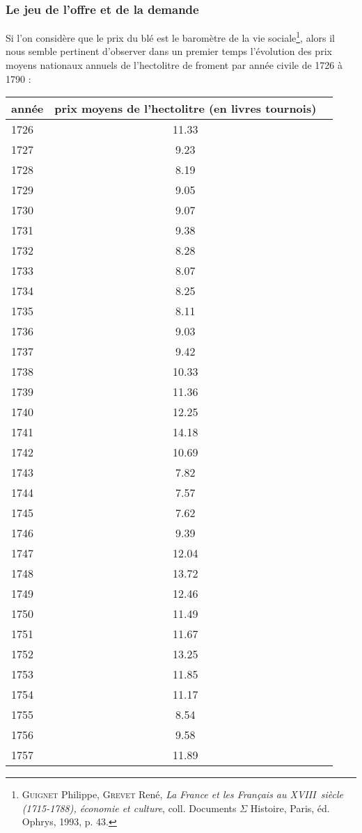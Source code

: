\documentclass[a4paper,11pt,]{scrartcl}
\begin{document}
\subsubsection{Le jeu de l'offre et de la demande}

Si l'on considère que le prix du blé est le \og baromètre de la vie
sociale\fg\footnote{\textsc{Guignet} Philippe, \textsc{Grevet} René,
  \emph{La France et les Français au XVIII\ieme~siècle (1715-1788), économie
et culture}, coll. \og Documents $\Sigma$ Histoire\fg, Paris, éd. Ophrys, 1993, p. 43.}, alors il nous semble pertinent d'observer dans un premier temps l'évolution des prix moyens nationaux annuels de l'hectolitre de froment par année civile de 1726 à 1790 :
\begin{longtable}{|l|c|r|}
\hline
année & prix moyens de l'hectolitre (en livres tournois)\\
\hline
1726 & 11.33\\
1727 & 9.23\\
1728 & 8.19\\
1729 & 9.05\\
1730 & 9.07\\
1731 & 9.38\\
1732 & 8.28\\
1733 & 8.07\\
1734 & 8.25\\
1735 & 8.11\\
1736 & 9.03\\
1737 & 9.42\\
1738 & 10.33\\
1739 & 11.36\\
1740 & 12.25\\
1741 & 14.18\\
1742 & 10.69\\
1743 & 7.82\\
1744 & 7.57\\
1745 & 7.62\\
1746 & 9.39\\
1747 & 12.04\\
1748 & 13.72\\
1749 & 12.46\\
1750 & 11.49\\
1751 & 11.67\\
1752 & 13.25\\
1753 & 11.85\\
1754 & 11.17\\
1755 & 8.54\\
1756 & 9.58\\
1757 & 11.89\\

\end{longtable}
\end{document}
